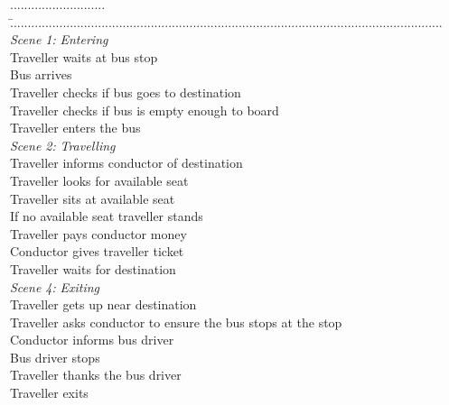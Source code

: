 \documentclass[11pt,a4paper]{article}
\begin{document}
	\begin{tabbing}
		........................... \= ...........................................................................................................................\\
		\textit{Scene 1:}	\> \textit{Entering}\\
			\> Traveller waits at bus stop\\
			\> Bus arrives\\
			\> Traveller checks if bus goes to destination\\
			\> Traveller checks if bus is empty enough to board\\
			\> Traveller enters the bus\\

		\textit{Scene 2:}	\> \textit{Travelling}\\
			\> Traveller informs conductor of destination\\
			\> Traveller looks for available seat\\
			\> Traveller sits at available seat\\
			\> If no available seat traveller stands\\
			\> Traveller pays conductor money\\
			\> Conductor gives traveller ticket \\
			\> Traveller waits for destination \\

			
		\textit{Scene 4:}	\> \textit{Exiting}\\
			\> Traveller gets up near destination\\
			\> Traveller asks conductor to ensure the bus stops at the stop\\
			\> Conductor informs bus driver \\
			\> Bus driver stops\\
			\> Traveller thanks the bus driver\\
			\> Traveller exits \\


	\end{tabbing}
	
\end{document}
